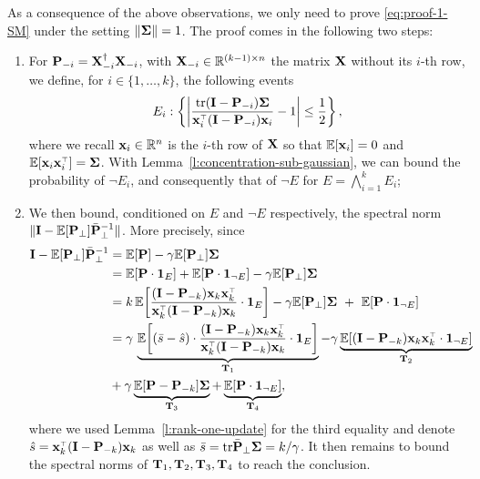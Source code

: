 \documentclass{article}
\begin{document}
\bigskip

As a consequence of the above observations, we only need to prove \eqref{eq:proof-1-SM} under the setting $\| \mathbf{\Sigma} \| = 1$. The proof comes in the following two steps:

\begin{enumerate}[leftmargin=*]
  \item For $\mathbf P_{-i} = \mathbf X_{-i}^\dagger \mathbf X_{-i}$, with $\mathbf X_{-i} \in \mathbb R^{(k-1) \times n}$ the matrix $\mathbf X$ without its $i$-th row, we define, for $i \in \{ 1, \ldots, k \}$, the following events
  \begin{equation}\label{eq:def-events-E-F}
    E_i: \left\{ \left| \frac{\tr (\I - \P_{-i}) \Sigmab}{\x_i^\top ( \I - \P_{-i}) \x_i} - 1 \right| \le \frac12 \right\}, 
  \end{equation}
  where we recall $\mathbf x_i \in \mathbb R^n$ is the $i$-th row of $\mathbf X$ so that $\mathbb E[\mathbf x_i] = 0$ and $\E[\x_i \x_i^\top] = \Sigmab$. With Lemma~\ref{l:concentration-sub-gaussian}, we can bound the probability of $\neg E_i$, and consequently that of $\neg E$ for $E = \bigwedge_{i=1}^k E_i$;
  \item We then bound, conditioned on $E$ and $\neg E$ respectively, the spectral norm $\| \mathbf I - \mathbb E[\mathbf P_\perp] \bar {\mathbf P}_\perp^{-1} \|$. More precisely, since
\begin{align*}
  \I-\E[\P_\perp]\bar\P_\perp^{-1}
    &= \E[\P] - \gamma\E[\P_\perp]\Sigmab
    \\
    &= \E[\P \cdot \one_E] +
    \E[\P  \cdot \one_{\neg E}]
    -\gamma\E[\P_\perp]\Sigmab\\
  &=k\,\E\bigg[\frac{(\I - \P_{-k})\x_k\x_k^\top}{\x_k^\top(\I - \P_{-k})\x_k} \cdot \one_E\bigg]
    -\gamma\E[\P_\perp]\Sigmab \ +\     \E[\P \cdot \one_{\neg E}]\\
  &=\gamma\,\underbrace{\E\bigg[(\bar s-\hat
    s)\cdot\frac{(\I -\P_{-k})\x_k\x_k^\top}{\x_k^\top(\I -\P_{-k})\x_k} \cdot \one_E\bigg]}_{\T_1}
    - \gamma \underbrace{\E[ (\I - \P_{-k}) \x_k\x_k^\top \cdot \one_{\neg E}]}_{\T_2} \\ 
    &+ \gamma \underbrace{\E[\P-\P_{-k}]\Sigmab}_{\T_3} + \underbrace{\E[\P \cdot \one_{\neg E}]}_{\T_4},
\end{align*}
where we used Lemma~\ref{l:rank-one-update} for the third equality and denote $\hat s = \x_k^\top ( \I - \P_{-k}) \x_k$ as well as $\bar s = \mathrm{tr} \bar {\mathbf P}_\perp \mathbf{\Sigma} =k/\gamma$. It then remains to bound the spectral norms of $ \mathbf{T}_1, \mathbf{T}_2, \mathbf{T}_3 ,\mathbf{T}_4$ to reach the conclusion.
\end{enumerate}
\end{document}
